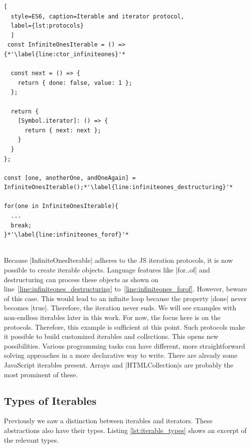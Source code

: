 \begin{lstlisting}[
  style=ES6, caption=Iterable and iterator protocol,
  label={lst:protocols}
  ]
 const InfiniteOnesIterable = () => {*'\label{line:ctor_infiniteones}'*

  const next = () => {
    return { done: false, value: 1 };
  };

  return {
    [Symbol.iterator]: () => {
      return { next: next };
    }
  }
};

const [one, anotherOne, andOneAgain] = InfiniteOnesIterable();*'\label{line:infiniteones_destructuring}'*

for(one in InfiniteOnesIterable){
  ...
  break;
}*'\label{line:infiniteones_forof}'*


\end{lstlisting}

Because |InfiniteOnesIterable| adheres to the JS iteration protocols, it is now 
possible to create iterable objects. Language features like |for..of| and 
destructuring can process these objects as shown on line~\ref{line:infiniteones_destructuring}
to~\ref{line:infiniteones_forof}. However, beware of this 
case. This would lead to an infinite loop because the property |done| never 
becomes |true|. Therefore, the iteration never ends. We will see examples 
with non-endless iterables later in this work. 
For now, the focus here is on the protocols. Therefore, this 
example is sufficient at this point.
\newline
Such protocols make it possible to build customized iterables and
collections. This opens new possibilities. Various programming tasks can have 
different, more straightforward solving approaches in a more declarative way to
write.
There are already some JavaScript iterables present. Arrays and
|HTMLCollection|s are probably the most prominent of these.

\subsection{Types of Iterables}
\label{sub:Types of Iterables}
Previously we saw a distinction between iterables and iterators. These abstractions
also have their types. Listing \ref{lst:iterable_types} shows an excerpt of the
relevant types.


